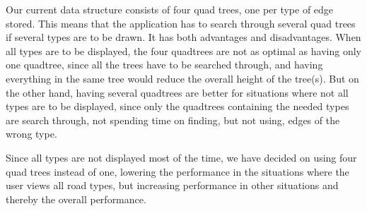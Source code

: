 Our current data structure consists of four quad trees, one per type of edge stored. This means that the application has to search through several quad trees if several types are to be drawn. It has both advantages and disadvantages. When all types are to be displayed, the four quadtrees are not as optimal as having only one quadtree, since all the trees have to be searched through, and having everything in the same tree would reduce the overall height of the tree(s). But on the other hand, having several quadtrees are better for situations where not all types are to be displayed, since only the quadtrees containing the needed types are search through, not spending time on finding, but not using, edges of the wrong type.

Since all types are not displayed most of the time, we have decided on using four quad trees instead of one, lowering the performance in the situations where the user views all road types, but increasing performance in other situations and thereby the overall performance.
